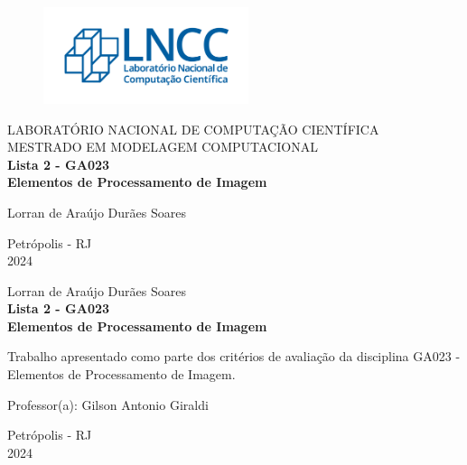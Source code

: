 \documentclass[a4paper, 11pt]{article}
\begin{document}
\begin{titlepage}
	\begin{center}
	\begin{figure}[!ht]
	\centering
	\includegraphics[width=6cm]{imgs/LNCC.png}
	\end{figure}
		LABORATÓRIO NACIONAL DE COMPUTAÇÃO CIENTÍFICA\\
		MESTRADO EM MODELAGEM COMPUTACIONAL\\ 
		\vspace{7cm}
		{\Large \textbf{Lista 2 - GA023 \\ Elementos de Processamento de Imagem}}
		\vspace{3cm}
	\end{center}
	
	\begin{flushright}
            Lorran de Araújo Durães Soares\\
	 \end{flushright}

	\begin{center}
		\vspace{\fill}
		 Petrópolis - RJ\\
         2024
	\end{center}
\end{titlepage}

\begin{titlepage}
	\begin{center}
        Lorran de Araújo Durães Soares \\
      \vspace{7cm}
      {\Large \textbf{Lista 2 - GA023 \\ Elementos de Processamento de Imagem}}
	\end{center}
\vspace{3cm}
	\begin{flushright}
   \begin{list}{}{
      \setlength{\leftmargin}{5cm}
      \setlength{\rightmargin}{0cm}
      \setlength{\labelwidth}{0pt}
      \setlength{\labelsep}{\leftmargin}}
      \begin{flushright}
          \item Trabalho apresentado como parte dos critérios de avaliação da disciplina GA023 - Elementos de Processamento de Imagem.
       \item Professor(a): Gilson Antonio Giraldi
      \end{flushright}
      
   \end{list}
	\end{flushright}

	\begin{center}
		\vspace{\fill}
		 Petrópolis - RJ\\
         2024
	\end{center}
\end{titlepage}
\end{document}

